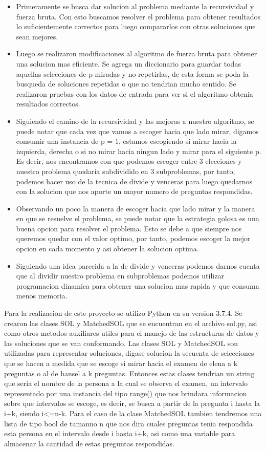 \documentclass[a4paper, 12pt]{article}
\begin{document}
\begin{itemize}
    \item Primeramente se busca dar solucion al problema mediante la recursividad y fuerza bruta. Con esto buscamos resolver el problema para obtener resultados lo suficientemente correctos para luego compararlos con otras soluciones que sean mejores.
    \item Luego se realizaron modificaciones al algoritmo de fuerza bruta para obtener una solucion mas eficiente. Se agrega un diccionario para guardar todas aquellas selecciones de p miradas y no repetirlas, de esta forma se poda la busqueda de soluciones repetidas o que no tendrian mucho sentido. Se realizaron pruebas con los datos de entrada para ver si el algoritmo obtenia resultados correctos.
    \item Siguiendo el camino de la recursividad y las mejoras a nuestro algoritmo, se puede notar que cada vez que vamos a escoger hacia que lado mirar, digamos consumir una instancia de p = 1, estamos escogiendo si mirar hacia la izquierda, derecha o si no mirar hacia ningun lado y mirar para el siguiente p. Es decir, nos encontramos con que podemos escoger entre 3 elecciones y nuestro problema quedaria subdividido en 3 subproblemas, 
    por tanto, podemos hacer uso de la tecnica de divide y venceras para luego quedarnos con la solucion que nos aporte un mayor numero de preguntas respondidas.
    \item Observando un poco la manera de escoger hacia que lado mirar y la manera en que se resuelve el problema, se puede notar que la estrategia golosa es una buena opcion para resolver el problema. Esto se debe a que siempre nos queremos quedar con el valor optimo, por tanto, podemos escoger la mejor opcion en cada momento y asi obtener la solucion optima.
    \item Siguiendo una idea parecida a la de divide y venceras podemos darnos cuenta que al dividir nuestro problema en subproblemas podemos utilizar programacion dinamica para obtener una solucion mas rapida y que consuma menos memoria.
\end{itemize}

Para la realizacion de este proyecto se utilizo Python en su version 3.7.4.
Se crearon las clases SOL y MatchedSOL que se encuentran en el archivo sol.py, asi como otros metodos auxiliares utiles para el manejo de las estructuras de datos y las soluciones que se van conformando.
Las clases SOL y MatchedSOL son utilizadas para representar soluciones, digase solucion la secuenta de selecciones que se hacen a medida que se escoge si mirar hacia el examen de elena a k preguntas o al de hansel a k preguntas.
Entonces estas clases tendrian un string que seria el nombre de la persona a la cual se observa el examen, un intervalo representado por una instancia del tipo range() que nos brindara informacion sobre que intervalos se escoge, es decir, se busca a partir de la pregunta i hasta la i+k, siendo i<=n-k.
Para el caso de la clase MatchedSOL tambien tendremos una lista de tipo bool de tamanno n que nos dira cuales preguntas tenia respondida esta persona en el intervalo desde i hasta i+k, asi como una variable para almacenar la cantidad de estas preguntas respondidas.
\end{document}
